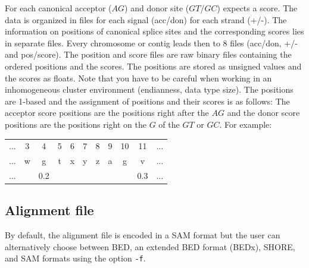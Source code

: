 \documentclass{article}
\begin{document}
For each canonical acceptor ($AG$) and donor site ($GT$/$GC$)
\PALMapper{} expects a score. The data is organized in files for each
signal (acc/don) for each strand (+/-). The information on positions of
canonical splice sites and the corresponding scores lies in separate
files. Every chromosome or contig leads then to $8$ files (acc/don, +/-
and pos/score). The position and score files are raw binary files
containing the ordered positions and the scores. The positions are
stored as unsigned values and the scores as floats. Note that you have
to be careful when working in an inhomogeneous cluster environment
(endianness, data type size). The positions are 1-based and the
assignment of positions and their scores is as follows: The acceptor
score positions are the positions right after the $AG$ and the donor
score positions are the positions right on the $G$ of the $GT$ or
$GC$. For example:
\begin{center}
\begin{tabular}{ccccccccccc}
... & 3 & 4 & 5 & 6 & 7 & 8 & 9 & 10 & 11 & ... \\ 
... & w & g & t & x & y & z & a & g  & v  & ... \\
... &   & 0.2&  &   &   &   &   &    & 0.3 & ... 
\end{tabular}
\end{center}


\subsection{Alignment file}
\label{sec:samfile}
By default, the alignment file is encoded in a SAM format but the user
can alternatively choose between BED, an extended BED format (BEDx),
SHORE, and SAM formats using the option \texttt{-f}.
\end{document}

